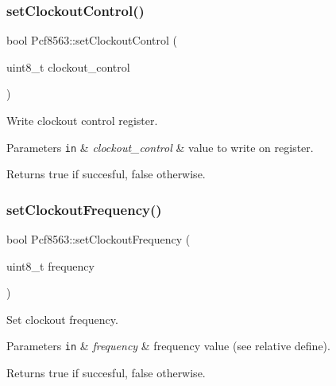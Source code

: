 \subsubsection{\texorpdfstring{set\+Clockout\+Control()}{setClockoutControl()}}
{\footnotesize\ttfamily bool Pcf8563\+::set\+Clockout\+Control (\begin{DoxyParamCaption}\item[{uint8\+\_\+t}]{clockout\+\_\+control }\end{DoxyParamCaption})}



Write clockout control register. 


\begin{DoxyParams}[1]{Parameters}
\mbox{\tt in}  & {\em clockout\+\_\+control} & value to write on register. \\
\hline
\end{DoxyParams}
\begin{DoxyReturn}{Returns}
true if succesful, false otherwise. 
\end{DoxyReturn}
\mbox{\label{namespacePcf8563_a4bc96bd7ccbd30db659536befb3da1fe}} 
\subsubsection{\texorpdfstring{set\+Clockout\+Frequency()}{setClockoutFrequency()}}
{\footnotesize\ttfamily bool Pcf8563\+::set\+Clockout\+Frequency (\begin{DoxyParamCaption}\item[{uint8\+\_\+t}]{frequency }\end{DoxyParamCaption})}



Set clockout frequency. 


\begin{DoxyParams}[1]{Parameters}
\mbox{\tt in}  & {\em frequency} & frequency value (see relative define). \\
\hline
\end{DoxyParams}
\begin{DoxyReturn}{Returns}
true if succesful, false otherwise. 
\end{DoxyReturn}
\mbox{\label{namespacePcf8563_a17680b8e68d064bb39007b4a6afc240e}} 
